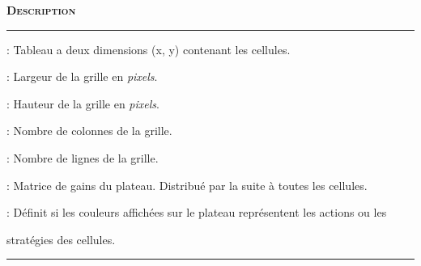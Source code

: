 \documentclass[a4paper, french]{article}
\begin{document}
\vspace{0.25cm}
\begin{description}[labelwidth=2.50cm]
    \small
    \item[\textbf{\textsc{Champ}}] \textbf{\textsc{Description}}
    \vspace{0.1cm}
    \hrule{}
    \item[\texttt{cells}]           :  Tableau a deux dimensions (x, y) contenant les cellules.
    \item[\texttt{width}]           :  Largeur de la grille en \textit{pixels}.
    \item[\texttt{height}]          :  Hauteur de la grille en \textit{pixels}.
    \item[\texttt{nbCols}]          :  Nombre de colonnes de la grille.
    \item[\texttt{nbLines}]         :  Nombre de lignes de la grille.
    \item[\texttt{payoffMatrix}]    :  Matrice de gains du plateau. Distribué par la suite à toutes les cellules.
    \item[\texttt{colorMode}]       :  Définit si les couleurs affichées sur le plateau représentent les actions ou les 
    \item[]\hspace{2.5pt}              stratégies des cellules.
\end{description}
\hrule{}
\vspace{0.5cm}
\end{document}
